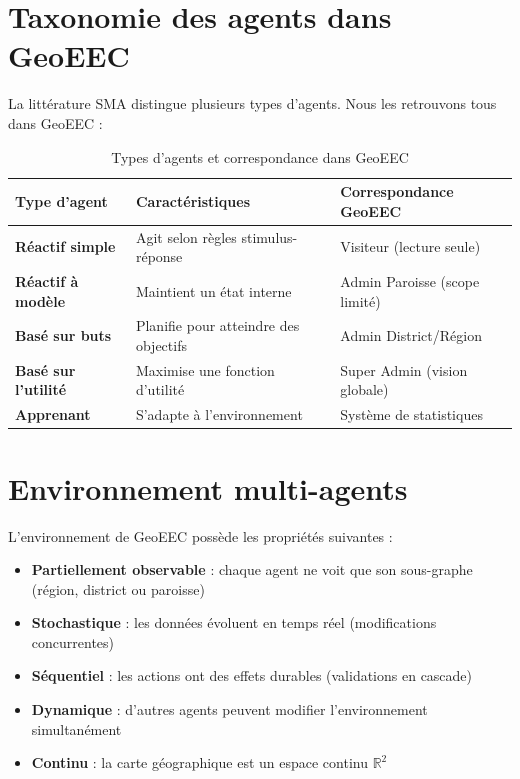 \documentclass[12pt, a4paper]{report}
\theoremstyle{definition}
\begin{document}
\section{Taxonomie des agents dans GeoEEC}

La littérature SMA distingue plusieurs types d'agents. Nous les retrouvons tous dans GeoEEC :

\begin{table}[H]
\centering
\caption{Types d'agents et correspondance dans GeoEEC}
\begin{tabularx}{\textwidth}{>{\bfseries}l X X}
\toprule
Type d'agent & Caractéristiques & Correspondance GeoEEC \\
\midrule
Réactif simple & Agit selon règles stimulus-réponse & Visiteur (lecture seule) \\
Réactif à modèle & Maintient un état interne & Admin Paroisse (scope limité) \\
Basé sur buts & Planifie pour atteindre des objectifs & Admin District/Région \\
Basé sur l'utilité & Maximise une fonction d'utilité & Super Admin (vision globale) \\
Apprenant & S'adapte à l'environnement & Système de statistiques \\
\bottomrule
\end{tabularx}
\end{table}

\section{Environnement multi-agents}

L'environnement de GeoEEC possède les propriétés suivantes :

\begin{itemize}
  \item \textbf{Partiellement observable} : chaque agent ne voit que son sous-graphe (région, district ou paroisse)
  \item \textbf{Stochastique} : les données évoluent en temps réel (modifications concurrentes)
  \item \textbf{Séquentiel} : les actions ont des effets durables (validations en cascade)
  \item \textbf{Dynamique} : d'autres agents peuvent modifier l'environnement simultanément
  \item \textbf{Continu} : la carte géographique est un espace continu $\mathbb{R}^2$
\end{itemize}
\end{document}
